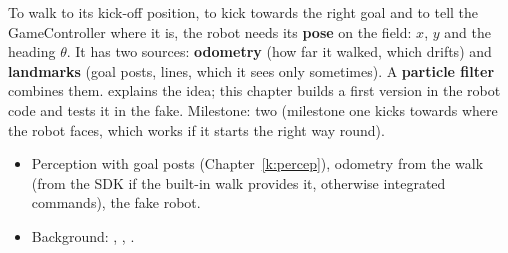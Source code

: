 \label{k:loc}

To walk to its kick-off position, to kick towards the right goal and to tell the GameController where it is, the robot needs its \textbf{pose} on the field: $x$, $y$ and the heading $\theta$. It has two sources: \textbf{odometry} (how far it walked, which drifts) and \textbf{landmarks} (goal posts, lines, which it sees only sometimes). A \textbf{particle filter} combines them.  explains the idea; this chapter builds a first version in the robot code and tests it in the fake. Milestone: two (milestone one kicks towards where the robot faces, which works if it starts the right way round).

\begin{needbox}
\begin{itemize}[nosep]
  \item Perception with goal posts (Chapter~\ref{k:percep}), odometry from the walk (from the SDK if the built-in walk provides it\guess, otherwise integrated commands), the fake robot.
  \item Background: , , .
\end{itemize}
\end{needbox}

